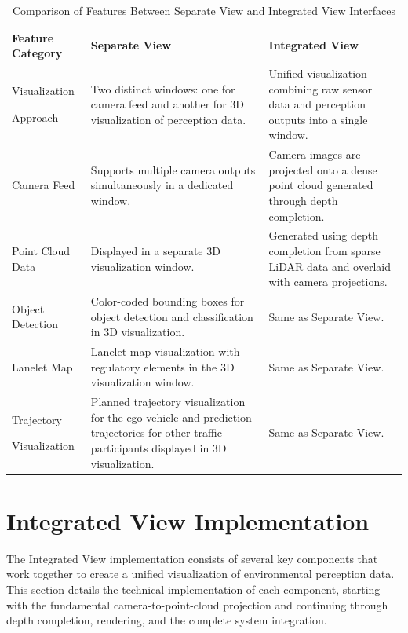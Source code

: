 \begin{table}[h!]
    \centering
    \begin{tabular}{@{}p{3cm}p{5.3cm}p{5.3cm}@{}}
    \toprule
    \textbf{Feature Category} & \textbf{Separate View} & \textbf{Integrated View} \\
    \midrule
    Visualization \par Approach & Two distinct windows: one for camera feed and another for 3D visualization of perception data. & Unified visualization combining raw sensor data and perception outputs into a single window. \\
    \midrule
    Camera Feed & Supports multiple camera outputs simultaneously in a dedicated window. & Camera images are projected onto a dense point cloud generated through depth completion. \\
    \midrule
    Point Cloud Data & Displayed in a separate 3D visualization window. & Generated using depth completion from sparse LiDAR data and overlaid with camera projections. \\
    \midrule
    Object Detection & Color-coded bounding boxes for object detection and classification in 3D visualization. & Same as Separate View. \\
    \midrule
    Lanelet Map & Lanelet map visualization with regulatory elements in the 3D visualization window. & Same as Separate View. \\
    \midrule
    Trajectory \par Visualization & Planned trajectory visualization for the ego vehicle and prediction trajectories for other traffic participants displayed in 3D visualization. & Same as Separate View. \\
    \bottomrule
    \end{tabular}
    \caption{Comparison of Features Between Separate View and Integrated View Interfaces}
    \label{table:interface_features}
    \end{table}


\section{Integrated View Implementation}\label{section:integratedviewimplementation}

The Integrated View implementation consists of several key components that work together to create a unified visualization of environmental perception data. This section details the technical implementation of each component, starting with the fundamental camera-to-point-cloud projection and continuing through depth completion, rendering, and the complete system integration.

